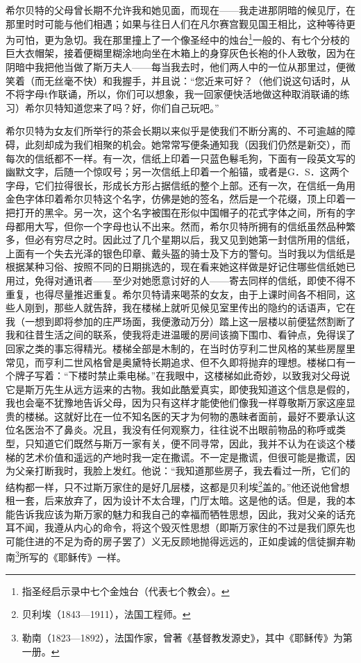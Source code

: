 \par 希尔贝特的父母曾长期不允许我和她见面，而现在——我走进那阴暗的候见厅，在那里时时可能与他们相遇；如果与往日人们在凡尔赛宫觐见国王相比，这种等待更为可怕，更为急切。我在那里撞上了一个像圣经中的烛台\footnote{指圣经启示录中七个金烛台（代表七个教会）。}一般的、有七个分枝的巨大衣帽架，接着便糊里糊涂地向坐在木箱上的身穿灰色长袍的仆人致敬，因为在阴暗中我把他当做了斯万夫人——每当我去时，他们两人中的一位从那里过，便微笑着（而无丝毫不快）和我握手，并且说：“您近来可好？（他们说这句话时，从不将字母t作联诵，所以，你们可以想象，我一回家便快活地做这种取消联诵的练习）希尔贝特知道您来了吗？好，你们自己玩吧。”
\par 希尔贝特为女友们所举行的茶会长期以来似乎是使我们不断分离的、不可逾越的障碍，此刻却成为我们相聚的机会。她常常写便条通知我（因我们仍然是新交），而每次的信纸都不一样。有一次，信纸上印着一只蓝色鬈毛狗，下面有一段英文写的幽默文字，后随一个惊叹号；另一次信纸上印着一个船锚，或者是G．S．这两个字母，它们拉得很长，形成长方形占据信纸的整个上部。还有一次，在信纸一角用金色字体印着希尔贝特这个名字，仿佛是她的签名，然后是一个花缀，顶上印着一把打开的黑伞。另一次，这个名字被围在形似中国帽子的花式字体之间，所有的字母都用大写，但你一个字母也认不出来。然而，希尔贝特所拥有的信纸虽然品种繁多，但必有穷尽之时。因此过了几个星期以后，我又见到她第一封信所用的信纸，上面有一个失去光泽的银色印章、戴头盔的骑士及下方的警句。当时我以为信纸是根据某种习俗、按照不同的日期挑选的，现在看来她这样做是好记住哪些信纸她已用过，免得对通讯者——至少对她愿意讨好的人——寄去同样的信纸，即使不得不重复，也得尽量推迟重复。希尔贝特请来喝茶的女友，由于上课时间各不相同，这些人刚到，那些人就告辞，我在楼梯上就听见候见室里传出的隐约的话语声，它在我（一想到即将参加的庄严场面，我便激动万分）踏上这一层楼以前便猛然割断了我和往昔生活之间的联系，使我将走进温暖的房间该摘下围巾、看钟点，免得误了回家之类的事忘得精光。楼梯全部是木制的，在当时仿亨利二世风格的某些房屋里常见，而亨利二世风格曾是奥黛特长期追求、但不久即将抛弃的理想。楼梯口有一个牌子写着：“下楼时禁止乘电梯。”在我眼中，这楼梯如此奇妙，以致我对父母说它是斯万先生从远方运来的古物。我如此酷爱真实，即使我知道这个信息是假的，我也会毫不犹豫地告诉父母，因为只有这样才能使他们像我一样尊敬斯万家这座显贵的楼梯。这就好比在一位不知名医的天才为何物的愚昧者面前，最好不要承认这位名医治不了鼻炎。况且，我没有任何观察力，往往说不出眼前物品的称呼或类型，只知道它们既然与斯万一家有关，便不同寻常，因此，我并不认为在谈这个楼梯的艺术价值和遥远的产地时我一定在撒谎。不一定是撒谎，但很可能是撒谎，因为父亲打断我时，我脸上发红。他说：“我知道那些房子，我去看过一所，它们的结构都一样，只不过斯万家住的是好几层楼，这都是贝利埃\footnote{贝利埃（1843—1911），法国工程师。}盖的。”他还说他曾想租一套，后来放弃了，因为设计不太合理，门厅太暗。这是他的话。但是，我的本能告诉我应该为斯万家的魅力和我自己的幸福而牺牲思想，因此，我对父亲的话充耳不闻，我遵从内心的命令，将这个毁灭性思想（即斯万家住的不过是我们原先也可能住进的不足为奇的房子罢了）义无反顾地抛得远远的，正如虔诚的信徒摒弃勒南\footnote{勒南（1823—1892），法国作家，曾著《基督教发源史》，其中《耶稣传》为第一册。}所写的《耶稣传》一样。
